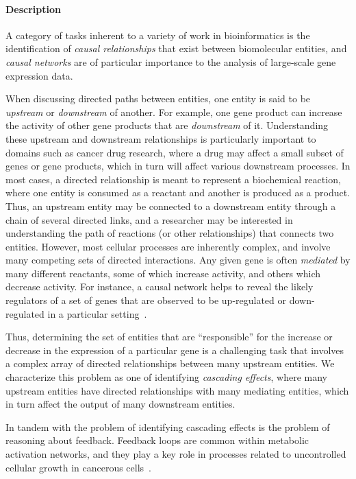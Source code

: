 \documentclass[twocolumn]{bmcart}%
\begin{document}
\paragraph*{Description}

A category of tasks inherent to a variety of work in bioinformatics is the identification of \textit{causal relationships} that exist between biomolecular entities, and \emph{causal networks} are of particular importance to the analysis of large-scale gene expression data.

When discussing directed paths between entities, one entity is said to be \emph{upstream} or \emph{downstream} of another.
For example, one gene product can increase the activity of other gene products that are \emph{downstream} of it.
Understanding these upstream and downstream relationships is particularly important to domains such as cancer drug research, where a drug may affect a small subset of genes or gene products, which in turn will affect various downstream processes.
In most cases, a directed relationship is meant to represent a biochemical reaction, where one entity is consumed as a reactant and another is produced as a product.
Thus, an upstream entity may be connected to a downstream entity through a chain of several directed links, and a researcher may be interested in understanding the path of reactions (or other relationships) that connects two entities.
However, most cellular processes are inherently complex, and involve many competing sets of directed interactions.
Any given gene is often \textit{mediated} by many different reactants, some of which increase activity, and others which decrease activity.
For instance, a causal network helps to reveal the likely regulators of a set of genes that are observed to be up-regulated or down-regulated in a particular setting~\cite{felciano2013predictive, Kramer2013ipa-causal}.

Thus, determining the set of entities that are ``responsible'' for the increase or decrease in the expression of a particular gene is a challenging task that involves a complex array of directed relationships between many upstream entities.
We characterize this problem as one of identifying \textit{cascading effects}, where many upstream entities have directed relationships with many mediating entities, which in turn affect the output of many downstream entities.

In tandem with the problem of identifying cascading effects is the problem of reasoning about feedback.
Feedback loops are common within metabolic activation networks, and they play a key role in processes related to uncontrolled cellular growth in cancerous cells~\cite{cairns2011regulation}.
\end{document}
